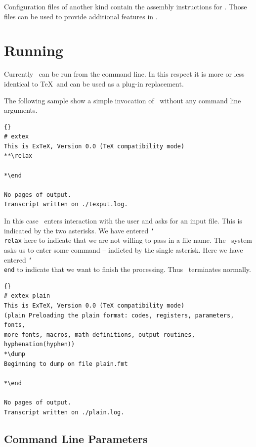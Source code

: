 \documentclass{extex-doc}
\makeatletter
\newcommand\macro[1]{\texttt{\char`\\ #1}\index{#1@\texttt{\char`\\ #1}}}
\makeatother
\begin{document}
Configuration files of another kind contain the assembly instructions
for \ExTeX. Those files can be used to provide additional features in
\ExTeX. 

\INCOMPLETE


\section{Running \ExTeX}

Currently \ExTeX\ can be run from the command line. In this respect it
is more or less identical to \TeX\ and can be used as a plug-in
replacement.

The following sample show a simple invocation of \ExTeX\ without any
command line arguments.

{%
\begin{lstlisting}{}
# extex
This is ExTeX, Version 0.0 (TeX compatibility mode)
**\relax

*\end

No pages of output.
Transcript written on ./texput.log.
\end{lstlisting}}

In this case \ExTeX\ enters interaction with the user and asks for an
input file. This is indicated by the two asterisks. We have entered
\macro{relax} here to indicate that we are not willing to pass in a
file name. The \ExTeX\ system asks us to enter some command --
indicted by the single asterisk. Here we have entered \macro{end} to
indicate that we want to finish the processing. Thus \ExTeX\ 
terminates normally.

\INCOMPLETE

{%
\begin{lstlisting}{}
# extex plain
This is ExTeX, Version 0.0 (TeX compatibility mode)
(plain Preloading the plain format: codes, registers, parameters, fonts,
more fonts, macros, math definitions, output routines, hyphenation(hyphen))
*\dump
Beginning to dump on file plain.fmt

*\end

No pages of output.
Transcript written on ./plain.log.
\end{lstlisting}}


\subsection{Command Line Parameters}
\end{document}
